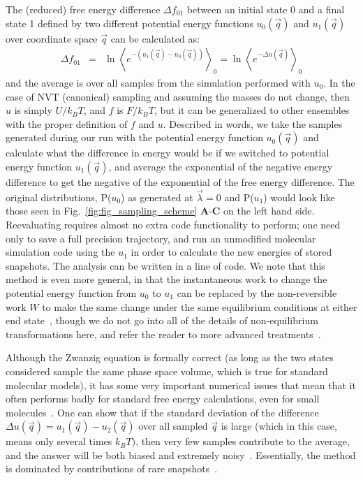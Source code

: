 \documentclass[9pt,bestpractices]{livecoms}
\newcommand{\expect}[1]{\left\langle{#1}\right\rangle}
\begin{document}
The (reduced) free energy difference $\Delta f_{01}$ between an initial state 0 and a final state 1 defined by two different potential energy functions 
$u_0(\vec{q})$ and $u_1(\vec{q})$ over coordinate space $\vec{q}$ can be calculated as:
\begin{eqnarray}
\Delta f_{01} & = & \ln \expect{e^{-(u_1(\vec{q}) - u_0(\vec{q}))}}_0 =  \ln \expect{e^{-\Delta u(\vec{q})} }_0
\end{eqnarray}\label{eqn.zwanzig}
and the average is over all samples from the simulation performed with $u_0$. In the case of NVT (canonical) sampling and assuming the masses do not change, then $u$ is simply $U/k_BT$, and $f$ is $F/k_BT$, but it can be generalized to other ensembles with the proper definition of $f$ and $u$.
Described in words, we take the samples generated during our run with the potential energy function $u_0(\vec{q})$ and calculate what the difference in energy would be if we switched to potential energy function $u_1(\vec{q})$, and average the exponential of the negative energy difference to get the negative of the exponential of the free energy difference. The original distributions, P($u_0$) as generated at $\vec{\lambda}=0$ and P($u_1$) would look like those seen in Fig.~\ref{fig:fig_sampling_scheme} \textbf{A}-\textbf{C} on the left hand side. Reevaluating requires almost no extra code functionality to perform; one need only to save a full precision trajectory, and run an unmodified molecular simulation code using the $u_1$ in order to calculate the new energies of stored snapshots. The analysis can be written in a line of code. We note that this method is even more general, in that the instantaneous work to change the potential energy function from $u_0$ to $u_1$ can be replaced by the non-reversible work $W$ to make the same change under the same equilibrium conditions at either end state~\cite{jarzynski1997nonequilibrium,jarzynski1998equilibrium,crooks2000pathensemble}, though we do not go into all of the details of non-equilibrium transformations here, and refer the reader to more advanced treatments~\cite{maragakis2008bayesian,oberhofer2005biased,procacci2015unbiased,shirts2003equilibriuma,ytreberg2004singleensemble}.

Although the Zwanzig equation is formally correct (as long as the two states considered sample the same phase space volume, which is true for standard molecular models), it has some very important numerical issues that mean that it often performs badly for standard free energy calculations, even for small molecules~\cite{shirts2005comparison,lu2003appropriate}. One can show that if the standard deviation of the difference $\Delta u(\vec{q}) = u_1(\vec{q})-u_2(\vec{q})$ over all sampled $\vec{q}$ is large (which in this case, means only several times $k_BT)$, then very few samples contribute to the average, and the answer will be both biased and extremely noisy~\cite{lelievre2010free}. Essentially, the method is dominated by contributions of rare snapshots~\cite{jarzynski2006rare, wu2005phasespaceb, wu2005phasespacec}. 
\end{document}
